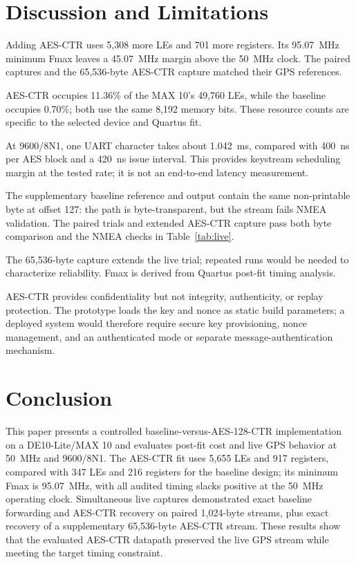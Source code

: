 \documentclass[runningheads]{llncs}
\begin{document}
\section{Discussion and Limitations}
Adding AES-CTR uses 5,308 more LEs and 701 more registers. Its 95.07~MHz minimum Fmax leaves a 45.07~MHz margin above the 50~MHz clock. The paired captures and the 65,536-byte AES-CTR capture matched their GPS references.

AES-CTR occupies 11.36\% of the MAX 10's 49,760 LEs, while the baseline occupies 0.70\%; both use the same 8,192 memory bits. These resource counts are specific to the selected device and Quartus fit.

At 9600/8N1, one UART character takes about 1.042~ms, compared with 400~ns per AES block and a 420~ns issue interval. This provides keystream scheduling margin at the tested rate; it is not an end-to-end latency measurement.

The supplementary baseline reference and output contain the same non-printable byte at offset 127: the path is byte-transparent, but the stream fails NMEA validation. The paired trials and extended AES-CTR capture pass both byte comparison and the NMEA checks in Table~\ref{tab:live}.

The 65,536-byte capture extends the live trial; repeated runs would be needed to characterize reliability. Fmax is derived from Quartus post-fit timing analysis.

AES-CTR provides confidentiality but not integrity, authenticity, or replay protection. The prototype loads the key and nonce as static build parameters; a deployed system would therefore require secure key provisioning, nonce management, and an authenticated mode or separate message-authentication mechanism.

\section{Conclusion}
This paper presents a controlled baseline-versus-AES-128-CTR implementation on a DE10-Lite/MAX 10 and evaluates post-fit cost and live GPS behavior at 50~MHz and 9600/8N1. The AES-CTR fit uses 5,655 LEs and 917 registers, compared with 347 LEs and 216 registers for the baseline design; its minimum Fmax is 95.07~MHz, with all audited timing slacks positive at the 50~MHz operating clock. Simultaneous live captures demonstrated exact baseline forwarding and AES-CTR recovery on paired 1,024-byte streams, plus exact recovery of a supplementary 65,536-byte AES-CTR stream. These results show that the evaluated AES-CTR datapath preserved the live GPS stream while meeting the target timing constraint.
\end{document}
